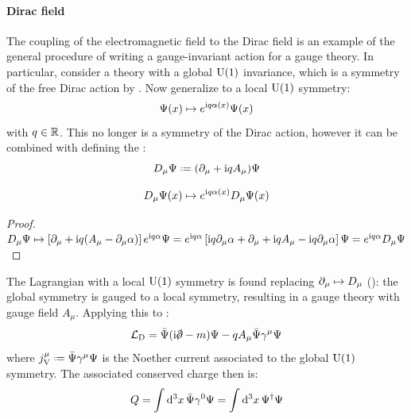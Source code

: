 \paragraph{Dirac field}

The coupling of the electromagnetic field to the Dirac field is an example of the general procedure of writing a gauge-invariant action for a gauge theory. In particular, consider a theory with a global $ \mathrm{U}(1) $ invariance, which is a symmetry of the free Dirac action by . Now generalize to a local $ \mathrm{U}(1) $ symmetry:
\begin{equation}
  \Psi(x) \mapsto e^{\mathrm{i} q \alpha(x)} \Psi(x)
  \label{eq:qed-dir-inv}
\end{equation}
with $ q \in \mathbb{R} $. This no longer is a symmetry of the Dirac action, however it can be combined with  defining the :
\begin{equation}
  D_\mu \Psi \defeq (\pa_\mu + \img q A_\mu) \Psi
\end{equation}

\begin{proposition}[before upper = {\tcbtitle}]{}{}
  \begin{equation}
    D_\mu \Psi(x) \mapsto e^{\mathrm{i} q \alpha(x)} D_\mu \Psi(x)
    \label{eq:qed-cov-der}
  \end{equation}
\end{proposition}

\begin{proofbox}
  \begin{proof}
      $ D_\mu \Psi \mapsto \left[ \partial_\mu + \mathrm{i} q (A_\mu - \partial_\mu \alpha) \right] e^{\mathrm{i} q \alpha} \Psi = e^{\mathrm{i} q \alpha} \left[ \mathrm{i} q \partial_\mu \alpha + \partial_\mu + \mathrm{i} q A_\mu - \mathrm{i} q \partial_\mu \alpha \right] \Psi = e^{\mathrm{i} q \alpha} D_\mu \Psi $
  \end{proof}
\end{proofbox}

The Lagrangian with a local $ \mathrm{U}(1) $ symmetry is found replacing $ \partial_\mu \mapsto D_\mu $ (): the global symmetry is gauged to a local symmetry, resulting in a gauge theory with gauge field $ A_\mu $.
Applying this to :
\begin{equation}
  \lag_\text{D} = \bar{\Psi} (\img \slashed{\pa} - m) \Psi - q A_\mu \bar{\Psi} \gamma^\mu \Psi
\end{equation}
where $ j_\text{V}^\mu \defeq \bar{\Psi} \gamma^\mu \Psi $ is the Noether current associated to the global $ \mathrm{U}(1) $ symmetry. The associated conserved charge then is:
\begin{equation}
  Q = \int \mathrm{d}^3x\, \bar{\Psi} \gamma^0 \Psi = \int \mathrm{d}^3x\, \Psi^\dagger \Psi
\end{equation}


